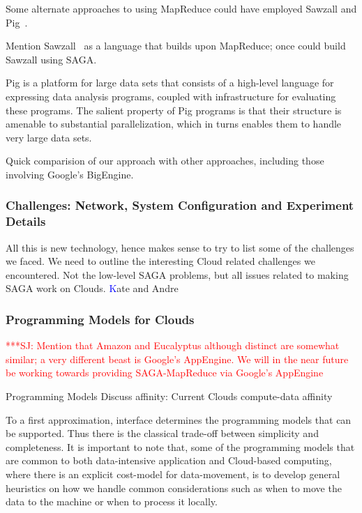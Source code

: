 \documentclass[conference,final]{IEEEtran}
\newcommand{\jhanote}[1]{ {\textcolor{red} { ***SJ: #1 }}}
\newcommand{\jhanote}[1]{}
\newcommand{\sagamapreduce }{SAGA-MapReduce }
\begin{document}
Some alternate approaches to using MapReduce could have employed
Sawzall and Pig~\cite{pig}.

Mention Sawzall~\cite{sawzall} as a language that builds upon
MapReduce; once could build Sawzall using SAGA.

Pig is a platform for large data sets that consists of a high-level
language for expressing data analysis programs, coupled with
infrastructure for evaluating these programs. The salient property of
Pig programs is that their structure is amenable to substantial
parallelization, which in turns enables them to handle very large data
sets.

Quick comparision of our approach with other approaches, including
those involving Google's BigEngine.


\subsubsection*{Challenges: Network, System Configuration and
  Experiment Details}

All this is new technology, hence makes sense to try to list some of
the challenges we faced. We need to outline the interesting Cloud
related challenges we encountered.  Not the low-level SAGA problems,
but all issues related to making SAGA work on Clouds.
{\textcolor{blue} Kate and Andre}

\subsubsection*{Programming Models for Clouds}

\jhanote{Mention that Amazon and Eucalyptus although distinct are
  somewhat similar; a very different beast is Google's AppEngine.  We
  will in the near future be working towards providing \sagamapreduce
  via Google's AppEngine}

  Programming Models Discuss affinity: Current Clouds
  compute-data affinity



To a first approximation, interface determines the programming models
that can be supported. Thus there is the classical trade-off between
simplicity and completeness.  It is important to note that, some of
the programming models that are common to both data-intensive
application and Cloud-based computing, where there is an explicit
cost-model for data-movement, is to develop general heuristics on how
we handle common considerations such as when to move the data to the
machine or when to process it locally.
\end{document}
